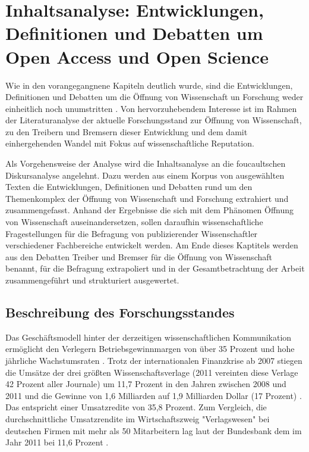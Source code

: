 \chapter{Inhaltsanalyse: Entwicklungen, Definitionen und Debatten um Open Access und Open Science}
Wie in den vorangegangnene Kapiteln deutlich wurde, sind die Entwicklungen, Definitionen und Debatten um die Öffnung von Wissenschaft un Forschung weder einheitlich noch unumstritten \cite{muller_2010_open} \cite{schulze_2013_open}. Von hervorzuhebendem Interesse ist im Rahmen der Literaturanalyse der aktuelle Forschungsstand zur Öffnung von Wissenschaft, zu den Treibern und Bremsern dieser Entwicklung und dem damit einhergehenden Wandel mit Fokus auf wissenschaftliche Reputation.

Als Vorgehensweise der Analyse wird die Inhaltsanalyse an die foucaultschen Diskursanalyse angelehnt. Dazu werden aus einem Korpus von ausgewählten Texten die Entwicklungen, Definitionen und Debatten rund um den Themenkomplex der Öffnung von Wissenschaft und Forschung extrahiert und zusammengefasst. Anhand der Ergebnisse die sich mit dem Phänomen Öffnung von Wissenschaft auseinandersetzen, sollen daraufhin wissenschaftliche Fragestellungen für die Befragung von publizierender Wissenschaftler verschiedener Fachbereiche entwickelt werden. Am Ende dieses Kaptitels werden aus den Debatten Treiber und Bremser für die Öffnung von Wissenschaft benannt, für die Befragung extrapoliert und in der Gesamtbetrachtung der Arbeit zusammengeführt und strukturiert ausgewertet.

\section{Beschreibung des Forschungsstandes}
Das Geschäftsmodell hinter der derzeitigen wissenschaftlichen Kommunikation ermöglicht den Verlegern Betriebsgewinnmargen von über 35 Prozent \cite{russell_2008_business} \cite{cope2014future} und hohe jährliche Wachstumsraten \cite{Wellcome_Trust_2003}. Trotz der internationalen Finanzkrise ab 2007 stiegen die Umsätze der drei größten Wissenschaftsverlage (2011 vereinten diese Verlage 42 Prozent aller Journale) um 11,7 Prozent in den Jahren zwischen 2008 und 2011 und die Gewinne von 1,6 Milliarden auf 1,9 Milliarden Dollar (17 Prozent) \cite{cope2014future}. Das entspricht einer Umsatzredite von 35,8 Prozent. Zum Vergleich, die durchschnittliche Umsatzrendite im Wirtschaftszweig "Verlagswesen" bei deutschen Firmen mit mehr als 50 Mitarbeitern lag laut der Bundesbank dem im Jahr 2011 bei 11,6 Prozent \cite{bundesbank_2014}.

